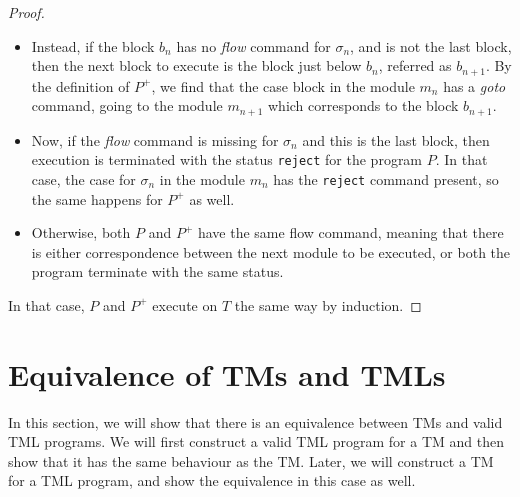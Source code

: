 \documentclass{article}
\begin{document}
\begin{proof}
\begin{itemize}
\begin{itemize}
\begin{itemize}
                    \item Instead, if the block $b_n$ has no \textit{flow} command for $\sigma_n$, and is not the last block, then the next block to execute is the block just below $b_n$, referred as $b_{n+1}$. By the definition of $P^+$, we find that the case block in the module $m_n$ has a \textit{goto} command, going to the module $m_{n+1}$ which corresponds to the block $b_{n+1}$. 
                
                    \item Now, if the \textit{flow} command is missing for $\sigma_n$ and this is the last block, then execution is terminated with the status \texttt{reject} for the program $P$. In that case, the case for $\sigma_n$ in the module $m_n$ has the \texttt{reject} command present, so the same happens for $P^+$ as well. 
                
                    \item Otherwise, both $P$ and $P^+$ have the same flow command, meaning that there is either correspondence between the next module to be executed, or both the program terminate with the same status. 
                \end{itemize}
            \end{itemize}
        \end{itemize}
        In that case, $P$ and $P^+$ execute on $T$ the same way by induction.
    \end{proof}

    \section{Equivalence of TMs and TMLs}
    In this section, we will show that there is an equivalence between TMs and valid TML programs. We will first construct a valid TML program for a TM and then show that it has the same behaviour as the TM. Later, we will construct a TM for a TML program, and show the equivalence in this case as well.
\end{document}

